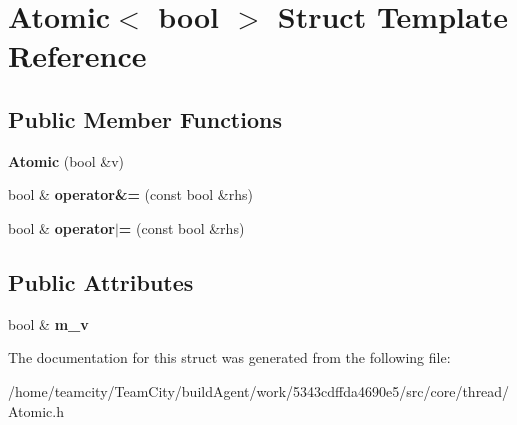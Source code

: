 \hypertarget{structAtomic_3_01bool_01_4}{}\section{Atomic$<$ bool $>$ Struct Template Reference}
\label{structAtomic_3_01bool_01_4}
\subsection*{Public Member Functions}
\begin{DoxyCompactItemize}
\item 
{\bfseries Atomic} (bool \&v)\hypertarget{structAtomic_3_01bool_01_4_a5cf338584c4fb42d13e90f116824620a}{}\label{structAtomic_3_01bool_01_4_a5cf338584c4fb42d13e90f116824620a}

\item 
bool \& {\bfseries operator\&=} (const bool \&rhs)\hypertarget{structAtomic_3_01bool_01_4_a996a6fb829239e38c8cffbcbda4aa4a3}{}\label{structAtomic_3_01bool_01_4_a996a6fb829239e38c8cffbcbda4aa4a3}

\item 
bool \& {\bfseries operator$\vert$=} (const bool \&rhs)\hypertarget{structAtomic_3_01bool_01_4_ae6e0b36f7eb450522e50524c1bd8a941}{}\label{structAtomic_3_01bool_01_4_ae6e0b36f7eb450522e50524c1bd8a941}

\end{DoxyCompactItemize}
\subsection*{Public Attributes}
\begin{DoxyCompactItemize}
\item 
bool \& {\bfseries m\+\_\+v}\hypertarget{structAtomic_3_01bool_01_4_a1457dd7ca19855645abcd2230ae43d91}{}\label{structAtomic_3_01bool_01_4_a1457dd7ca19855645abcd2230ae43d91}

\end{DoxyCompactItemize}


The documentation for this struct was generated from the following file\+:\begin{DoxyCompactItemize}
\item 
/home/teamcity/\+Team\+City/build\+Agent/work/5343cdffda4690e5/src/core/thread/Atomic.\+h\end{DoxyCompactItemize}
